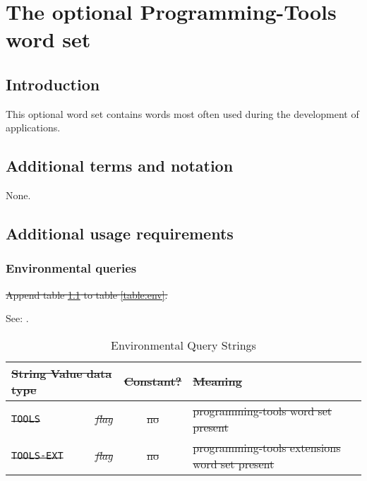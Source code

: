 \chapter{The optional Programming-Tools word set} %

\section{Introduction} %

This optional word set contains words most often used during the
development of applications.

\section{Additional terms and notation} %

None.

\section{Additional usage requirements} %

\subsection{Environmental queries} %

\cbstart{}%
\sout{Append table \ref{tools:env} to table \ref{table:env}.}

See: .

\begin{table}[ht]
  \begin{center}
	\caption{Environmental Query Strings}
	\label{tools:env}
	\begin{tabular}{p{9em}rcp{}}
		\hline\hline
		\multicolumn{2}{l}{\sout{String \hfill Value data type}} & \sout{Constant?} & \sout{Meaning} \\
		\hline
		\sout{\texttt{TOOLS}}		& \sout{\emph{flag}}		& \sout{no}	&
			\sout{programming-tools word set present} \\
		\sout{\texttt{TOOLS-EXT}}	& \sout{\emph{flag}}		& \sout{no}	&
			\sout{programming-tools extensions word set present} \\
		\hline\hline
	\end{tabular}
  \end{center}
\end{table}
\cbend

